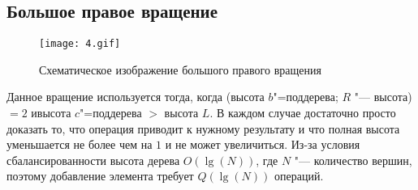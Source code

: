 \subsection*{Большое правое вращение}

\begin{figure}[ht]
    \texttt{[image: 4.gif]}
    
    \caption{Схематическое изображение большого правого вращения}

\end{figure}

Данное вращение используется тогда, когда (высота $b$"=поддерева; $R$ "--- высота)
$= 2$ ивысота $c$"=поддерева $ > $ высота $L$.
В каждом случае достаточно просто доказать то, 
что операция приводит к нужному результату и
что полная высота уменьшается не более чем на $1$ и не может увеличиться.
Из-за условия сбалансированности высота дерева $O(\lg(N))$,
где $N$ "--- количество вершин, поэтому добавление элемента требует $Q(\lg(N))$ операций.